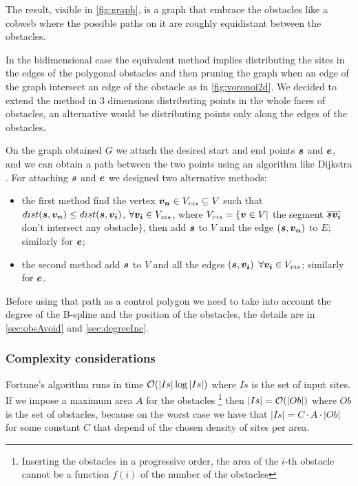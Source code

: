 \documentclass[dissertation.tex]{subfiles}
\begin{document}
The result, visible in \cref{fig:graph}, is a graph that embrace the
obstacles like a cobweb where the possible paths on it are roughly
equidistant between the obstacles.

In the bidimensional case the equivalent method implies distributing
the sites in the edges of the polygonal obstacles and then pruning the
graph when an edge of the graph intersect an edge of the obstacle as
in \cref{fig:voronoi2d}.
We decided to extend the method in 3 dimensions distributing points in
the whole faces of obstacles, an alternative would be distributing
points only along the edges of the obstacles.

On the graph obtained $G$ we attach the desired start and end
points $\boldsymbol{s}$ and $\boldsymbol{e}$, and we can obtain a path between the two points using an
algorithm like Dijkstra \cite{dijkstra}\cite{knuth}. For attaching $\boldsymbol{s}$
and $\boldsymbol{e}$ we designed two
alternative methods:
\begin{itemize}
\item the first method find the vertex $\boldsymbol{v_n}\in V_{vis}\subseteq V$ such
  that $dist(\boldsymbol{s},\boldsymbol{v_n})\leq dist(\boldsymbol{s},\boldsymbol{v_i})$, $\forall \boldsymbol{v_i}\in V_{vis}$, where
  $V_{vis}=\{\boldsymbol{v}\in V |$ the segment $\overline{\boldsymbol{s} \boldsymbol{v_i}}$ don't intersect
  any obstacle$\}$, then add $\boldsymbol{s}$ to $V$ and the edge $(\boldsymbol{s},\boldsymbol{v_n})$ to $E$;
  similarly for $\boldsymbol{e}$;
\item the second method add $\boldsymbol{s}$ to $V$ and all the edges $(\boldsymbol{s},\boldsymbol{v_i})$
  $\forall \boldsymbol{v_i}\in V_{vis}$; similarly for $\boldsymbol{e}$.
\end{itemize}

Before using that path as a control polygon
we need to take into account the degree of the B-spline and the
position of the obstacles, the details are in \cref{sec:obsAvoid} and
\cref{sec:degreeInc}.

\subsubsection{Complexity considerations}
Fortune's algorithm runs in time $\mathcal{O}(|Is|\log |Is|)$ \cite{deberg}
where $Is$ is
the set 
of input sites. If we impose a maximum area $A$ for the obstacles
\footnote{Inserting the obstacles in a progressive order, the area of the $i$-th
obstacle cannot be a function $f(i)$ of the number of
the obstacles} then $|Is|=\mathcal{O}(|Ob|)$ where $Ob$ is the set of
obstacles, because on the worst case we have that $|Is|=C\cdot A\cdot
|Ob|$ for
some constant $C$ that depend of the chosen density of sites per area.
\end{document}
